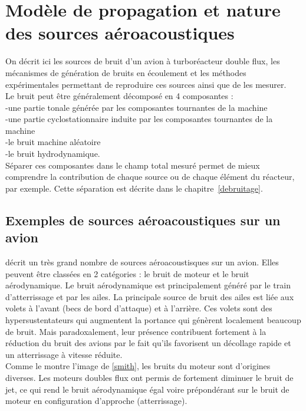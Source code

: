 \chapter{Modèle de propagation et nature des sources aéroacoustiques}


On décrit ici les sources de bruit d'un avion à turboréacteur double flux, les mécanismes de génération de bruits en écoulement et les méthodes expérimentales permettant de reproduire ces sources ainsi que de les mesurer. \\




Le bruit peut être généralement décomposé en 4 composantes : \\
-une partie tonale générée par les composantes tournantes de la machine\\
-une partie cyclostationnaire induite par les composantes tournantes de la machine\\
-le bruit machine aléatoire \\
-le bruit hydrodynamique.\\


Séparer ces composantes dans le champ total mesuré permet de mieux comprendre la contribution de chaque source ou de chaque élément du réacteur, par exemple. Cette séparation est décrite dans le chapitre~\ref{debruitage}.




\section{Exemples de sources aéroacoustiques sur un avion}

\cite{Smith1989} décrit un très grand nombre de sources aéroacoustisques sur un avion. Elles peuvent être classées en 2 catégories : le bruit de moteur et le bruit aérodynamique. Le bruit aérodynamique est principalement généré par le train d'atterrissage et par les ailes. La principale source de bruit des ailes est liée aux volets à l'avant (becs de bord d'attaque) et à l'arrière. Ces volets sont des hypersustentateurs qui augmentent la portance qui génèrent localement beaucoup de bruit. Mais paradoxalement, leur présence contribuent fortement à la réduction du bruit des avions par le fait qu'ils favorisent un décollage rapide et un atterrissage à vitesse réduite.\\
Comme le montre l'image de \cite{Smith1989} \ref{smith}, les bruits du moteur sont d'origines diverses. Les moteurs doubles flux ont permis de fortement diminuer le bruit de jet, ce qui rend le bruit aérodynamique égal voire prépondérant sur le bruit de moteur en configuration d'approche (atterrissage).

